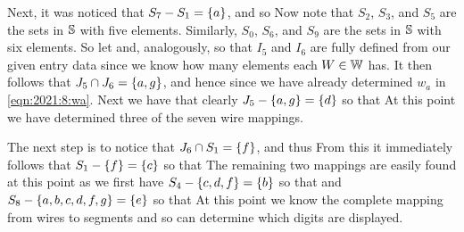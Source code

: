 \documentclass{article}
\begin{document}
{    Next, it was noticed that $S_7 - S_1 = \left\{ a \right\}$, and so
    Now note that $S_2$, $S_3$, and $S_5$ are the sets in $\mathbb{S}$ with five elements.
    Similarly, $S_0$, $S_6$, and $S_9$ are the sets in $\mathbb{S}$ with six elements.
    So let
    and, analogously,
    so that $I_5$ and $I_6$ are fully defined from our given entry data since we know how many elements each $W \in \mathbb{W}$ has.
    It then follows that $J_5 \cap J_6 = \left\{ a, g \right\}$, and hence
    since we have already determined $w_a$ in \eqref{eqn:2021:8:wa}.
    Next we have that clearly $J_5 - \left\{ a, g \right\} = \left\{ d \right\}$ so that
    At this point we have determined three of the seven wire mappings.

    The next step is to notice that $J_6 \cap S_1 = \left\{ f \right\}$, and thus
    From this it immediately follows that $S_1 - \left\{ f \right\} = \left\{ c \right\}$ so that
    The remaining two mappings are easily found at this point as we first have $S_4 - \left\{ c, d, f \right\} = \left\{ b \right\}$ so that
    and $S_8 - \left\{ a, b, c, d, f, g \right\} = \left\{ e \right\}$ so that
    At this point we know the complete mapping from wires to segments and so can determine which digits are displayed.
}
\end{document}
